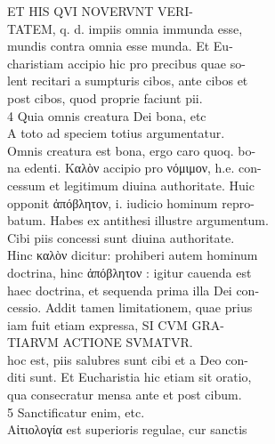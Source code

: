 \documentclass{article}
\begin{document}
\begin{pages}
                ET HIS QVI NOVERVNT VERI- \\
                TATEM, q. d. impiis omnia immunda esse, \\
                mundis contra omnia esse munda. Et Eu- \\
                charistiam accipio hic pro precibus quae so- \\
                lent recitari a sumpturis cibos, ante cibos et \\
                post cibos, quod proprie faciunt pii. \\
                4 Quia omnis creatura Dei bona, etc \\
                A toto ad speciem totius argumentatur. \\
                Omnis creatura est bona, ergo caro quoq. bo- \\
                na edenti. Καλὸν accipio pro νόμιμον, h.e. con- \\
                cessum et legitimum diuina authoritate. Huic \\
                opponit ἀπόβλητον, i. iudicio hominum repro- \\
                batum. Habes ex antithesi illustre argumentum. \\
                Cibi piis concessi sunt diuina authoritate. \\
                Hinc καλὸν dicitur: prohiberi autem hominum \\
                doctrina, hinc ἀπόβλητον : igitur cauenda est \\
                haec doctrina, et sequenda prima illa Dei con- \\
                cessio. Addit tamen limitationem, quae prius \\
                iam fuit etiam expressa, SI CVM GRA- \\
                TIARVM ACTIONE SVMATVR. \\
                hoc est, piis salubres sunt cibi et a Deo con- \\
                diti sunt. Et Eucharistia hic etiam sit oratio, \\
                qua consecratur mensa ante et post cibum. \\
                5 Sanctificatur enim, etc. \\
                Αἰτιολογία est superioris regulae, cur sanctis \\

\end{pages}
\end{document}
